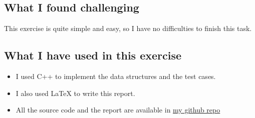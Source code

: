 \documentclass[a4paper,12pt]{report}
\begin{document}
\subsection{What I found challenging}
\begin{flushleft}
  This exercise is quite simple and easy, so I have no difficulties to finish this task.
\end{flushleft}
\subsection{What I have used in this exercise}
\begin{itemize}
  \item I used C++ to implement the data structures and the test cases.
  \item I also used \LaTeX{} to write this report.
  \item All the source code and the report are available in \href{https://github.com/yuran1811/}{my github repo}
\end{itemize}
\end{document}
